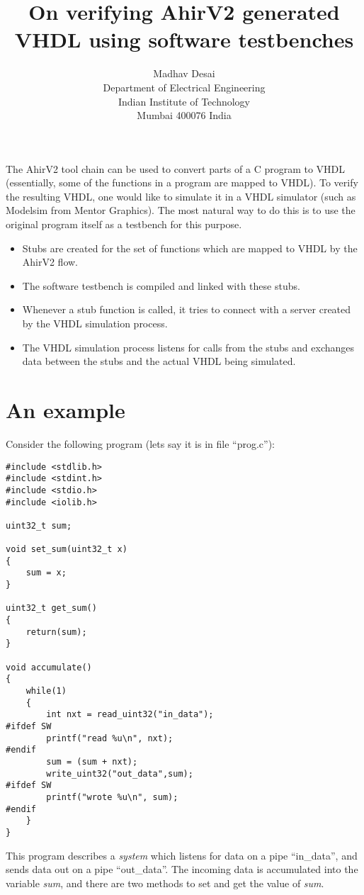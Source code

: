 \documentclass{article}
\title{On verifying AhirV2 generated VHDL using software testbenches}
\author{Madhav Desai \\ Department of Electrical Engineering \\ Indian Institute of Technology \\
	Mumbai 400076 India}
\begin{document}
\maketitle


The AhirV2 tool chain can be used to convert parts of a C program to VHDL
(essentially, some of the functions in a program are mapped to VHDL).
To verify the resulting VHDL, one would like to simulate it in a
VHDL simulator (such as Modelsim from Mentor Graphics).  The most
natural way to do this is to use the original program itself
as a testbench for this purpose.

\begin{itemize}
\item Stubs are created for the set of functions which are mapped to  
VHDL by the AhirV2 flow.
\item The software testbench is compiled and linked with these stubs.
\item Whenever a stub function is called, it tries to connect with
a server created by the VHDL simulation process.
\item The VHDL simulation process listens for calls from the stubs
and exchanges data between the stubs and the actual VHDL being simulated.
\end{itemize}


\section{An example}

Consider the following program (lets say it is in file ``prog.c''):
\begin{verbatim}
#include <stdlib.h>
#include <stdint.h>
#include <stdio.h>
#include <iolib.h>

uint32_t sum;

void set_sum(uint32_t x)
{
    sum = x;
}

uint32_t get_sum()
{
    return(sum);
}

void accumulate()
{
    while(1)
    {
        int nxt = read_uint32("in_data");
#ifdef SW
        printf("read %u\n", nxt);
#endif
        sum = (sum + nxt);
        write_uint32("out_data",sum);
#ifdef SW
        printf("wrote %u\n", sum);
#endif
    }
}

\end{verbatim}

This program describes a {\em system} which listens
for data on a pipe ``in\_data'', and sends data
out on a pipe ``out\_data''.  The incoming data
is accumulated into the variable {\em sum}, and
there are two methods to set and get the value
of {\em sum}.
\end{document}
